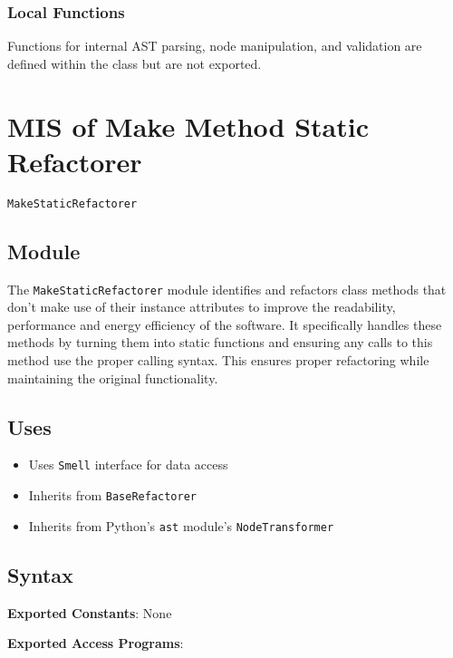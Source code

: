 \documentclass[12pt, titlepage]{article}
\begin{document}
\subsubsection{Local Functions}
Functions for internal AST parsing, node manipulation, and validation are defined within the class but are not exported.
  
\newpage

\section{MIS of Make Method Static Refactorer} \label{mis:MakeStatic}

\texttt{MakeStaticRefactorer}

\subsection{Module}

The \texttt{MakeStaticRefactorer} module identifies and refactors 
class methods that don't make use of their instance attributes to improve the readability, performance and energy efficiency of the software. It specifically handles these methods by turning them into static functions and ensuring any calls to this method use the proper calling syntax. This ensures proper refactoring while maintaining the original functionality.

\subsection{Uses}
\begin{itemize}
  \item Uses \texttt{Smell} interface for data access
  \item Inherits from \texttt{BaseRefactorer}
  \item Inherits from Python's \texttt{ast} module's \texttt{NodeTransformer}
\end{itemize}
  
\subsection{Syntax}
\noindent
\textbf{Exported Constants}: None

\noindent
\textbf{Exported Access Programs}:
  
\end{document}
